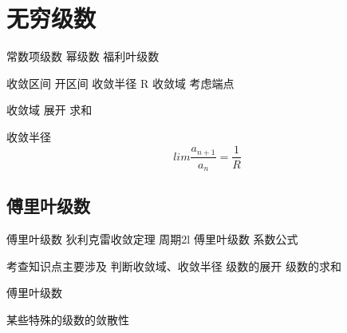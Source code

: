 \chapter{无穷级数}

常数项级数
幂级数
福利叶级数

收敛区间 开区间
收敛半径 R
收敛域   考虑端点

收敛域
展开
求和


收敛半径
$$lim \frac{a_{n+1}}{a_n} = \frac{1}{R} $$




\section{傅里叶级数}

傅里叶级数
狄利克雷收敛定理
周期2l
傅里叶级数
系数公式


考查知识点主要涉及
判断收敛域、收敛半径
级数的展开
级数的求和

傅里叶级数

某些特殊的级数的敛散性
